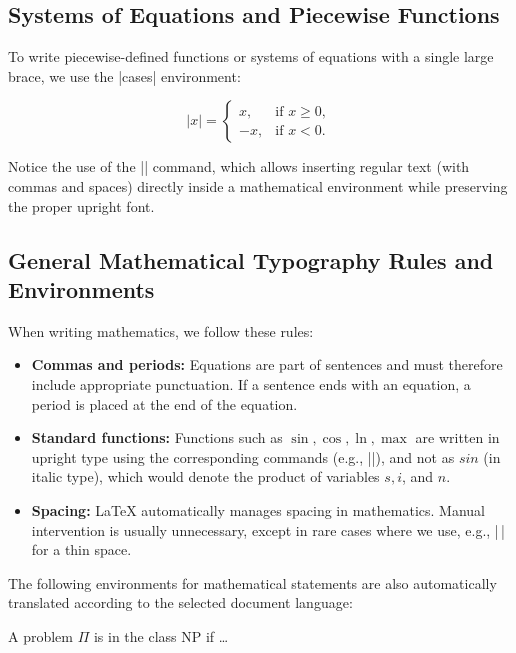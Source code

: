 \documentclass[9pt]{style/friteza}
\begin{document}
\subsection{Systems of Equations and Piecewise Functions}

To write piecewise-defined functions or systems of equations with a single large brace, we use the \ltx|cases| environment:

\begin{equation}
    |x| = \begin{cases}
        x,  & \text{if } x \ge 0, \\
        -x, & \text{if } x < 0.
    \end{cases}
\end{equation}

Notice the use of the \ltx|| command, which allows inserting regular text (with commas and spaces) directly inside a mathematical environment while preserving the proper upright font.

\subsection{General Mathematical Typography Rules and Environments}

When writing mathematics, we follow these rules:
\begin{itemize}
    \item \textbf{Commas and periods:} Equations are part of sentences and must therefore include appropriate punctuation. If a sentence ends with an equation, a period is placed at the end of the equation.
    \item \textbf{Standard functions:} Functions such as $\sin, \cos, \ln, \max$ are written in upright type using the corresponding commands (e.g., \ltx|\sin|), and not as $sin$ (in italic type), which would denote the product of variables $s, i$, and $n$.
    \item \textbf{Spacing:} \LaTeX{} automatically manages spacing in mathematics. Manual intervention is usually unnecessary, except in rare cases where we use, e.g., \ltx|\,| for a thin space.
\end{itemize}

The following environments for mathematical statements are also automatically translated according to the selected document language:

\begin{definition}
A problem $\Pi$ is in the class NP if \dots
\end{definition}
\end{document}
